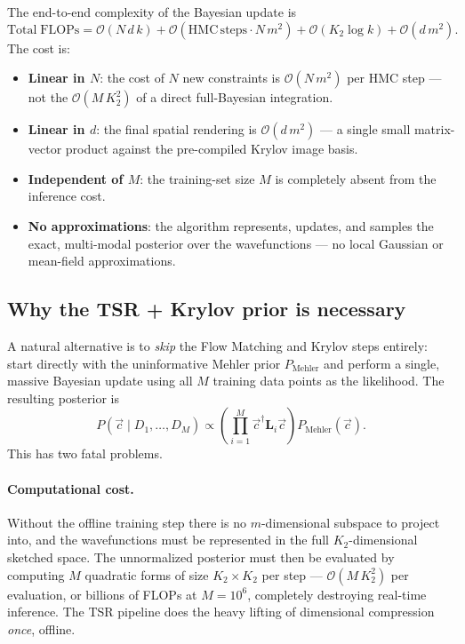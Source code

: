 \documentclass[11pt, a4paper]{article}
\begin{document}
The end-to-end complexity of the Bayesian update is
\begin{equation}
  \mathrm{Total\;FLOPs}=\mathcal{O}(N\,d\,k)+\mathcal{O}(\mathrm{HMC\,steps}
  \cdot N\,m^2)+\mathcal{O}(K_2\log k)+\mathcal{O}(d\,m^2).
  \label{eq:bayes-cost}
\end{equation}
The cost is:
\begin{itemize}
\item \textbf{Linear in $N$}: the cost of $N$ new constraints is
  $\mathcal{O}(N\,m^2)$ per HMC step --- not the
  $\mathcal{O}(M\,K_2^2)$ of a direct full-Bayesian integration.
\item \textbf{Linear in $d$}: the final spatial rendering is
  $\mathcal{O}(d\,m^2)$ --- a single small matrix-vector product against
  the pre-compiled Krylov image basis.
\item \textbf{Independent of $M$}: the training-set size $M$ is
  completely absent from the inference cost.
\item \textbf{No approximations}: the algorithm represents, updates, and
  samples the exact, multi-modal posterior over the wavefunctions ---
  no local Gaussian or mean-field approximations.
\end{itemize}

\subsection{Why the TSR + Krylov prior is necessary}

A natural alternative is to \emph{skip} the Flow Matching and Krylov
steps entirely: start directly with the uninformative Mehler prior
$P_{\mathrm{Mehler}}$ and perform a single, massive Bayesian update
using all $M$ training data points as the likelihood. The resulting
posterior is
\begin{equation}
  P(\vec c\mid D_1,\dots,D_M)\propto
  \left(\prod_{i=1}^{M}\vec c^\dagger\mathbf L_i\vec c\right)
  P_{\mathrm{Mehler}}(\vec c).
  \label{eq:direct}
\end{equation}
This has two fatal problems.

\paragraph{Computational cost.} Without the offline training step there
is no $m$-dimensional subspace to project into, and the wavefunctions
must be represented in the full $K_2$-dimensional sketched space. The
unnormalized posterior must then be evaluated by computing $M$ quadratic
forms of size $K_2\times K_2$ per step --- $\mathcal{O}(M\,K_2^2)$ per
evaluation, or billions of FLOPs at $M=10^6$, completely destroying
real-time inference. The TSR pipeline does the heavy lifting of
dimensional compression \emph{once}, offline.
\end{document}
